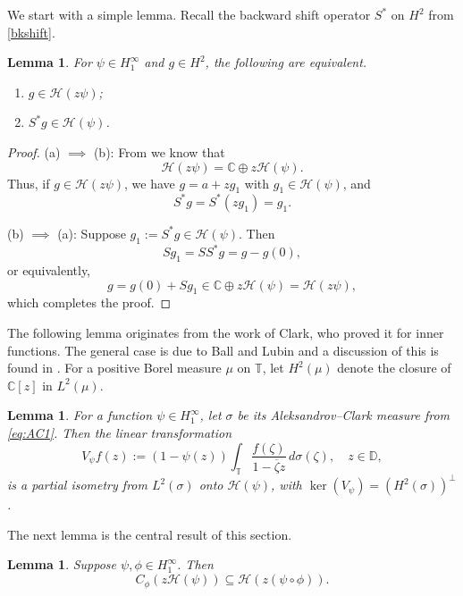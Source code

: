 \documentclass[11pt]{amsart}
\def\C{{\mathbb{C}}}
\def\D{\mathbb{D}}
\def\T{\mathbb{T}}
\def\HH{{\mathcal H}}
\renewcommand{\subset}{\subseteq}
\numberwithin{equation}{section}
\theoremstyle{plain}
\newtheorem{lemma}[equation]{Lemma}
\theoremstyle{definition}
\begin{document}
 
We start with a simple lemma. Recall the backward shift operator $S^{*}$ on $H^2$ from \eqref{bkshift}.



\begin{lemma}\label{le:action of S*}
 For  $\psi\in H^\infty_1$ and $g \in H^2$, the following are equivalent. 
    \begin{enumerate}
        \item $g\in\HH(z\psi)$;
        \item  $S^*g\in\HH(\psi)$.
    \end{enumerate} 
\end{lemma}

\begin{proof}
	(a) $\implies$ (b): From \cite[Thm.~18.8]{Hb2-book} we know that $$\HH(z\psi)=\C\oplus z\HH(\psi).$$ Thus, if $g\in\HH(z\psi)$, we have $g=a+zg_1$ with $ g_1\in\HH(\psi)$, and $$S^*g=S^*(zg_1)=g_1.$$ 
    
    (b) $\implies$ (a): Suppose $g_1:=S^*g\in\HH(\psi)$. Then $$Sg_1=SS^*g=g-g(0),$$ or equivalently, $$g=g(0)+Sg_1\in \C \oplus z\HH(\psi)=\HH(z\psi),$$
    which completes the proof. 
\end{proof}





The following lemma originates from the work of Clark, who proved it for inner functions. The general case is due to Ball and Lubin and a discussion of this is found in \cite[Ch.~II, IV]{MR1289670}. For a positive Borel measure $\mu$ on $\T$, let $H^2(\mu)$ denote the closure of $\C[z]$ in $L^2(\mu)$. 

\begin{lemma}\label{le:cauchy integral rep}
	For a function $\psi\in H^\infty_1$, let $\sigma$ be its Aleksandrov--Clark measure from \eqref{eq:AC1}. Then the linear transformation 
	\[
	V_\psi f(z):=(1-\psi(z))\int_{\T} \frac{f(\zeta)}{1- \overline{\zeta} z}\,d\sigma(\zeta), \quad z \in \D,
	\]
	is a partial isometry from $L^2(\sigma)$ onto $\HH(\psi)$, with $\ker(V_\psi)=(H^2(\sigma))^\perp$.
\end{lemma}

The next lemma is the central result of this section.

\begin{lemma}\label{le:my pet result}
	Suppose $\psi ,\phi\in H^\infty_1$. Then
	\[
	C_\phi(z\HH(\psi ))\subset \HH(z(\psi \circ\phi)).
	\]
\end{lemma}
\end{document}
